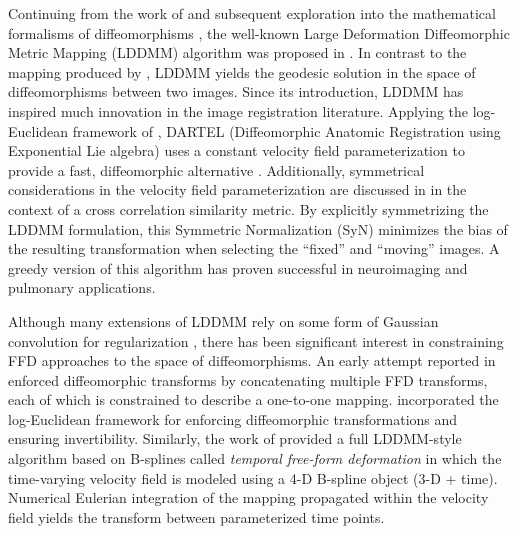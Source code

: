 \documentclass{frontiersSCNS}
\begin{document}
Continuing from the work of \cite{christensen1996} and subsequent exploration into the mathematical formalisms of diffeomorphisms \citep[e.g.][]{dupuis1998},
the well-known Large Deformation Diffeomorphic Metric Mapping (LDDMM) algorithm
was proposed in \cite{beg2005}.  In contrast to the mapping produced
by \cite{christensen1996}, LDDMM yields the geodesic solution in the space of diffeomorphisms between two images. Since its introduction, LDDMM has
inspired much innovation in the image registration literature.  Applying
the log-Euclidean framework of \cite{arsigny2006}, DARTEL (Diffeomorphic Anatomic Registration using Exponential Lie algebra) uses a constant velocity field parameterization to provide a fast, diffeomorphic alternative \citep{ashburner2007}. Additionally, symmetrical considerations in the velocity field parameterization are discussed in \cite{avants2008} in the context of a cross correlation similarity metric.
By explicitly symmetrizing the LDDMM formulation, this Symmetric Normalization (SyN) minimizes the bias of the resulting transformation when selecting the ``fixed'' and ``moving'' images.  A greedy version of this algorithm has proven successful in neuroimaging \citep{klein2009} and pulmonary \citep{murphy2011} applications.





Although many extensions of LDDMM rely
on some form of Gaussian convolution for
regularization \citep[e.g.][]{risser2011}, there has been significant interest in constraining
FFD approaches to the space of diffeomorphisms.
An early attempt reported in \cite{rueckert2006} enforced
diffeomorphic transforms
by concatenating multiple FFD transforms, each of which is constrained
to describe a one-to-one mapping.
\cite{modat2011} incorporated the log-Euclidean
framework for enforcing diffeomorphic transformations and ensuring invertibility.  Similarly, the work of \cite{de-craene2011} provided
a full LDDMM-style algorithm based on B-splines called
{\it temporal free-form deformation} in which the
time-varying velocity field
is modeled using a 4-D B-spline object (3-D + time).  Numerical Eulerian integration of the mapping propagated within the velocity field yields the transform between parameterized time points.
\end{document}
